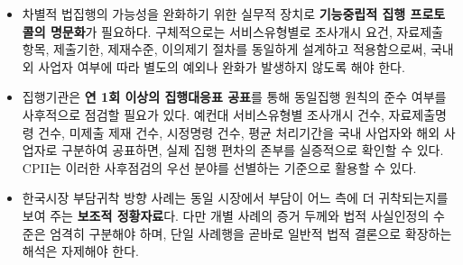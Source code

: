 \documentclass[11pt,a4paper]{report}
\begin{document}
\begin{itemize}[leftmargin=1.8em,itemsep=0.35em]
  \item 차별적 법집행의 가능성을 완화하기 위한 실무적 장치로 \textbf{기능중립적 집행 프로토콜의 명문화}가 필요하다. 구체적으로는 서비스유형별로 조사개시 요건, 자료제출 항목, 제출기한, 제재수준, 이의제기 절차를 동일하게 설계하고 적용함으로써, 국내외 사업자 여부에 따라 별도의 예외나 완화가 발생하지 않도록 해야 한다.
  \item 집행기관은 \textbf{연 1회 이상의 집행대응표 공표}를 통해 동일집행 원칙의 준수 여부를 사후적으로 점검할 필요가 있다. 예컨대 서비스유형별 조사개시 건수, 자료제출명령 건수, 미제출 제재 건수, 시정명령 건수, 평균 처리기간을 국내 사업자와 해외 사업자로 구분하여 공표하면, 실제 집행 편차의 존부를 실증적으로 확인할 수 있다. CPII는 이러한 사후점검의 우선 분야를 선별하는 기준으로 활용할 수 있다.
  \item 한국시장 부담귀착 방향 사례는 동일 시장에서 부담이 어느 측에 더 귀착되는지를 보여 주는 \textbf{보조적 정황자료}다. 다만 개별 사례의 증거 두께와 법적 사실인정의 수준은 엄격히 구분해야 하며, 단일 사례행을 곧바로 일반적 법적 결론으로 확장하는 해석은 자제해야 한다.
\end{itemize}
\end{document}
